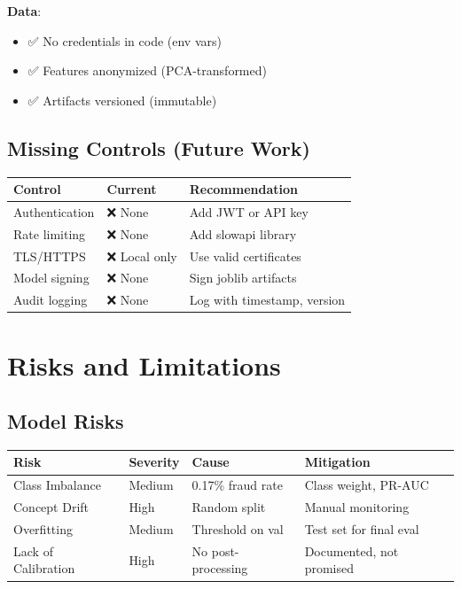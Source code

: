 \documentclass[12pt,a4paper]{article}
\begin{document}
\textbf{Data}:
\begin{itemize}
    \item ✅ No credentials in code (env vars)
    \item ✅ Features anonymized (PCA-transformed)
    \item ✅ Artifacts versioned (immutable)
\end{itemize}

\subsection{Missing Controls (Future Work)}

\begin{table}[H]
\centering
\small
\begin{tabular}{|l|l|l|}
\hline
\textbf{Control} & \textbf{Current} & \textbf{Recommendation} \\
\hline
Authentication & ❌ None & Add JWT or API key \\
Rate limiting & ❌ None & Add slowapi library \\
TLS/HTTPS & ❌ Local only & Use valid certificates \\
Model signing & ❌ None & Sign joblib artifacts \\
Audit logging & ❌ None & Log with timestamp, version \\
\hline
\end{tabular}
\end{table}

\section{Risks and Limitations}

\subsection{Model Risks}

\begin{table}[H]
\centering
\small
\begin{tabular}{|l|l|l|l|}
\hline
\textbf{Risk} & \textbf{Severity} & \textbf{Cause} & \textbf{Mitigation} \\
\hline
Class Imbalance & Medium & 0.17\% fraud rate & Class weight, PR-AUC \\
Concept Drift & High & Random split & Manual monitoring \\
Overfitting & Medium & Threshold on val & Test set for final eval \\
Lack of Calibration & High & No post-processing & Documented, not promised \\
\hline
\end{tabular}
\end{table}
\end{document}
